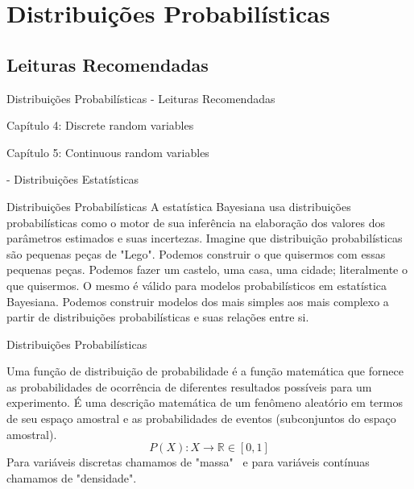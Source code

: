 \section{Distribuições Probabilísticas}

\subsection{Leituras Recomendadas}
\begin{frame}{Distribuições Probabilísticas - Leituras Recomendadas}
	\begin{vfilleditems}
		\item \textcite{dekkingModernIntroductionProbability2010}
		\begin{vfilleditems}
			\item Capítulo 4: Discrete random variables
			\item Capítulo 5: Continuous random variables
		\end{vfilleditems}
		\item \textcite{betancourtProbabilisticBuildingBlocks2019}
		\item \textcite{storopoli2021estatisticabayesianaR} - Distribuições Estatísticas
	\end{vfilleditems}
\end{frame}

\begin{frame}{Distribuições Probabilísticas}
	A estatística Bayesiana usa distribuições probabilísticas como o motor de sua inferência na elaboração dos
	valores dos parâmetros estimados e suas incertezas.
	\vfill
	Imagine que distribuição probabilísticas são pequenas peças de "Lego". Podemos construir o que quisermos com
	essas pequenas peças. Podemos fazer um castelo, uma casa, uma cidade; literalmente o que quisermos. O mesmo é
	válido para modelos probabilísticos em estatística Bayesiana. Podemos construir modelos dos mais simples aos mais
	complexo a partir de distribuições probabilísticas e suas relações entre si.
\end{frame}

\begin{frame}{Distribuições Probabilísticas}
	\begin{defn}
		Uma função de distribuição de probabilidade é a função matemática que fornece as probabilidades de ocorrência
		de diferentes resultados possíveis para um experimento. É uma descrição matemática de um fenômeno
		aleatório em termos de seu espaço amostral e as probabilidades de eventos (subconjuntos do espaço amostral).
		$$P(X): X \to \mathbb{R} \in [0, 1]$$
		Para variáveis discretas chamamos de "massa"~
		e para variáveis contínuas chamamos de "densidade".
	\end{defn}
\end{frame}

